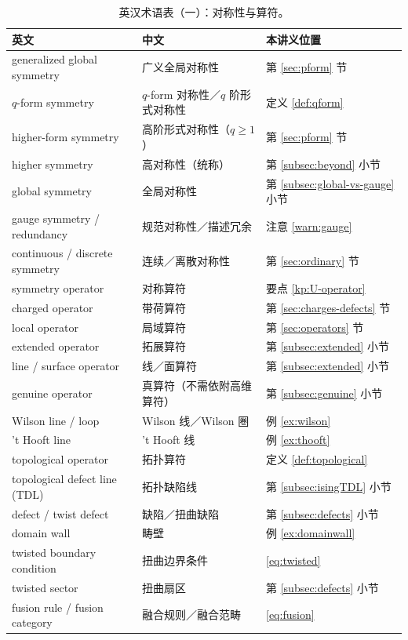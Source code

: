 \documentclass[UTF8,a4paper,11pt]{ctexart}
\theoremstyle{plain}
\theoremstyle{definition}
\theoremstyle{remark}
\begin{document}
\begin{table}[htbp]
\centering
\caption{英汉术语表（一）：对称性与算符。}
\label{tab:glossary1}
\begin{tabular}{@{}lll@{}}
\toprule
英文 & 中文 & 本讲义位置 \\
\midrule
generalized global symmetry & 广义全局对称性 & 第 \ref{sec:pform} 节 \\
$q$-form symmetry & $q$-form 对称性／$q$ 阶形式对称性
  & 定义 \ref{def:qform} \\
higher-form symmetry & 高阶形式对称性（$q\ge1$） & 第 \ref{sec:pform} 节 \\
higher symmetry & 高对称性（统称） & 第 \ref{subsec:beyond} 小节 \\
global symmetry & 全局对称性 & 第 \ref{subsec:global-vs-gauge} 小节 \\
gauge symmetry / redundancy & 规范对称性／描述冗余 & 注意 \ref{warn:gauge} \\
continuous / discrete symmetry & 连续／离散对称性 & 第 \ref{sec:ordinary} 节 \\
symmetry operator & 对称算符 & 要点 \ref{kp:U-operator} \\
charged operator & 带荷算符 & 第 \ref{sec:charges-defects} 节 \\
local operator & 局域算符 & 第 \ref{sec:operators} 节 \\
extended operator & 拓展算符 & 第 \ref{subsec:extended} 小节 \\
line / surface operator & 线／面算符 & 第 \ref{subsec:extended} 小节 \\
genuine operator & 真算符（不需依附高维算符） & 第 \ref{subsec:genuine} 小节 \\
Wilson line / loop & Wilson 线／Wilson 圈 & 例 \ref{ex:wilson} \\
't Hooft line & 't Hooft 线 & 例 \ref{ex:thooft} \\
topological operator & 拓扑算符 & 定义 \ref{def:topological} \\
topological defect line (TDL) & 拓扑缺陷线 & 第 \ref{subsec:isingTDL} 小节 \\
defect / twist defect & 缺陷／扭曲缺陷 & 第 \ref{subsec:defects} 小节 \\
domain wall & 畴壁 & 例 \ref{ex:domainwall} \\
twisted boundary condition & 扭曲边界条件 & \eqref{eq:twisted} \\
twisted sector & 扭曲扇区 & 第 \ref{subsec:defects} 小节 \\
fusion rule / fusion category & 融合规则／融合范畴 & \eqref{eq:fusion} \\

\end{tabular}
\end{table}
\end{document}
